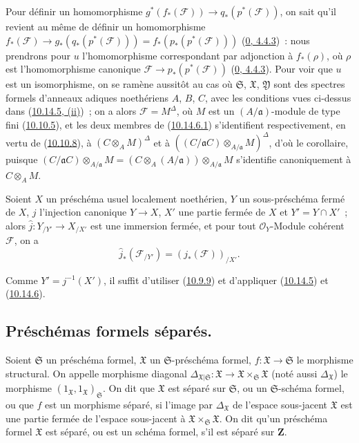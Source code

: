 Pour définir un homomorphisme
$g^*(f_*(\mathscr{F}))\to q_*(p^*(\mathscr{F}))$, on sait qu'il revient au
même de définir un homomorphisme
$f_*(\mathscr{F})\to g_*(q_*(p^*(\mathscr{F})))
=f_*(p_*(p^*(\mathscr{F})))$
(\hyperref[0.4.4.3-fr]{0, 4.4.3})~: nous prendrons pour $u$ l'homomorphisme correspondant par adjonction à $f_*(\rho)$, où $\rho$
est l'homomorphisme canonique
$\mathscr{F}\to p_*(p^*(\mathscr{F}))$
(\hyperref[0.4.4.3-fr]{0, 4.4.3}). Pour voir que $u$ est un isomorphisme, on
se ramène aussitôt au cas où $\mathfrak{S}$, $\mathfrak{X}$,
$\mathfrak{Y}$ sont des spectres formels d'anneaux adiques noethériens $A$,
$B$, $C$, avec les conditions vues ci-dessus dans
(\hyperref[I.10.14.5-fr]{10.14.5, (ii)})~; on a alors
$\mathscr{F}=M^\Delta$, où $M$ est un $(A/\mathfrak{a})$-module de type fini
(\hyperref[I.10.10.5-fr]{10.10.5}), et les deux membres de
(\hyperref[I.10.14.6.1-fr]{10.14.6.1}) s'identifient respectivement, en vertu
de (\hyperref[I.10.10.8-fr]{10.10.8}), à
$(C\otimes_A M)^\Delta$ et à
$((C/\mathfrak{a}C)\otimes_{A/\mathfrak{a}}M)^\Delta$, d'où le corollaire,
puisque
$(C/\mathfrak{a}C)\otimes_{A/\mathfrak{a}}M
=(C\otimes_A(A/\mathfrak{a}))\otimes_{A/\mathfrak{a}}M$ s'identifie
canoniquement à $C\otimes_A M$.

\begin{corollary}[10.14.7]
\label{I.10.14.7-fr}
Soient $X$ un préschéma usuel localement noethérien, $Y$ un sous-préschéma
fermé de $X$, $j$ l'injection canonique $Y\to X$, $X'$ une partie fermée de
$X$ et $Y'=Y\cap X'$~; alors
$\widehat{j}:Y_{/Y'}\to X_{/X'}$ est une immersion fermée, et pour tout
$\mathscr{O}_Y$-Module cohérent $\mathscr{F}$, on a
\[
  \widehat{j}_*(\mathscr{F}_{/Y'})=(j_*(\mathscr{F}))_{/X'}.
\]
\end{corollary}

Comme $Y'=j^{-1}(X')$, il suffit d'utiliser
(\hyperref[I.10.9.9-fr]{10.9.9}) et d'appliquer
(\hyperref[I.10.14.5-fr]{10.14.5}) et
(\hyperref[I.10.14.6-fr]{10.14.6}).

\subsection{Préschémas formels séparés.}
\label{subsection:I.10.15-fr}

\begin{definition}[10.15.1]
\label{I.10.15.1-fr}
Soient $\mathfrak{S}$ un préschéma formel, $\mathfrak{X}$ un
$\mathfrak{S}$-préschéma formel,
$f:\mathfrak{X}\to\mathfrak{S}$ le morphisme structural. On appelle
morphisme diagonal
$\Delta_{\mathfrak{X}|\mathfrak{S}}:\mathfrak{X}\to
\mathfrak{X}\times_{\mathfrak{S}}\mathfrak{X}$ (noté aussi
$\Delta_{\mathfrak{X}}$) le morphisme
$(1_{\mathfrak{X}},1_{\mathfrak{X}})_{\mathfrak{S}}$. On dit que
$\mathfrak{X}$ est séparé sur $\mathfrak{S}$, ou un
$\mathfrak{S}$-schéma formel, ou que $f$ est un morphisme séparé, si l'image
par $\Delta_{\mathfrak{X}}$ de l'espace sous-jacent $\mathfrak{X}$ est une
partie fermée de l'espace sous-jacent à
$\mathfrak{X}\times_{\mathfrak{S}}\mathfrak{X}$. On dit qu'un préschéma
formel $\mathfrak{X}$ est séparé, ou est un schéma formel, s'il est séparé
sur $\mathbf{Z}$.
\end{definition}

